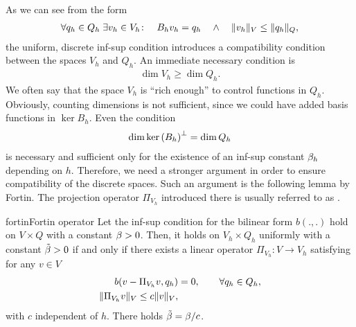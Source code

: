 \begin{intro}
  As we can see from the form
  \begin{gather}
    \forall q_h\in Q_h \;
    \exists v_h\in V_h\colon
    \quad B_h v_h = q_h
    \quad\wedge\quad
    \lVert v_h\rVert_V \le \lVert q_h\rVert_Q,
  \end{gather}
  the uniform, discrete inf-sup condition introduces a compatibility
  condition between the spaces $V_h$ and $Q_h$. An immediate necessary
  condition is
  \begin{gather}
    \dim V_h \ge \dim Q_h.
  \end{gather}
  We often say that the space $V_h$ is ``rich enough'' to control
  functions in $Q_h$. Obviously, counting dimensions is not
  sufficient, since we could have added basis functions in
  $\ker{B_h}$. Even the condition
  \begin{gather}
    \dim{\operatorname{ker}\left(B_h\right)}^\perp = \dim Q_h
  \end{gather}
  is necessary and sufficient only for the existence of an inf-sup
  constant $\beta_h$ depending on $h$. Therefore, we need a stronger
  argument in order to ensure compatibility of the discrete
  spaces. Such an argument is the following lemma by Fortin. The
  projection operator $\Pi_{V_h}$ introduced there is usually referred
  to as .
\end{intro}

\begin{Lemma*}{fortin}{Fortin operator}
  Let the inf-sup condition for the bilinear form $b(.,.)$
  hold on $V\times Q$ with a constant
  $\beta>0$. Then, it holds on $V_h\times Q_h$ uniformly with a
  constant $\tilde{\beta}>0$ if and only if there exists a linear
  operator $\Pi_{V_h}\colon V\to V_h$ satisfying for any $v\in V$
  \begin{align}
    \label{eq:galerkin:15}
    b(v-\Pi_{V_h}v,q_h) &= 0,\qquad\forall q_h\in Q_h,
    \\
    \label{eq:galerkin:16}
    \lVert\Pi_{V_h}v\rVert_V \le c \lVert v\rVert_V,
  \end{align}
  with $c$ independent of $h$. There holds $\tilde{\beta} = \beta/c$.
\end{Lemma*}

